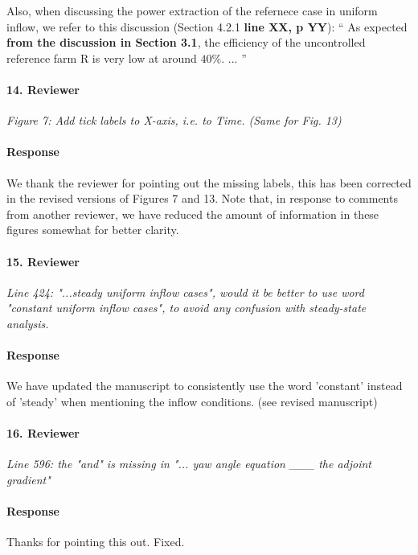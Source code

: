 \documentclass[]{article}
\newcommand{\red}[1]{\textbf{\color{red} #1}}
\newcommand{\revision}[1]{\textbf{#1}}
\begin{document}
Also, when discussing the power extraction of the refernece case in uniform inflow, we refer to this discussion (Section 4.2.1 \red{line XX, p YY}):
``
 As expected \revision{from the discussion in Section 3.1}, the efficiency of the uncontrolled reference farm R is very low at around $40\%$. ...
''

\hrulefill

\paragraph{14. Reviewer} \textit{Figure 7: Add tick labels to X-axis, i.e. to Time. (Same for Fig. 13)}

\paragraph{Response} We thank the reviewer for pointing out the missing labels, this has been corrected in the revised versions of Figures 7 and 13. Note that, in response to comments from another reviewer, we have reduced the amount of information in these figures somewhat for better clarity. 

\hrulefill

\paragraph{15. Reviewer} \textit{Line 424: "...steady uniform inflow cases", would it be better to use word "constant uniform inflow cases", to avoid any confusion with steady-state analysis.}

\paragraph{Response} We have updated the manuscript to consistently use the word 'constant' instead of 'steady' when mentioning the inflow conditions. (see revised manuscript)

\hrulefill

\paragraph{16. Reviewer} \textit{Line 596: the "and" is missing in "... yaw angle equation \_\_\_ the adjoint gradient"}

\paragraph{Response} Thanks for pointing this out. Fixed.
\end{document}
